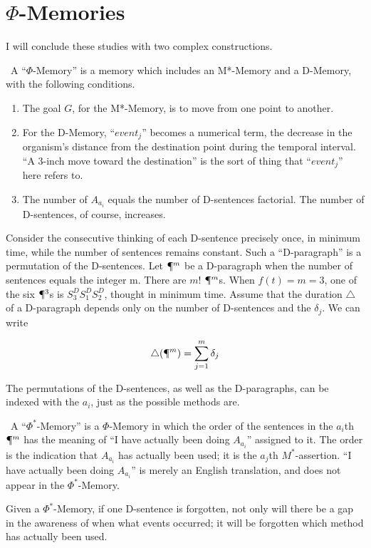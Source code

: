 \section{$\Phi$-Memories}
I will conclude these studies with two complex constructions. 

\begin{hangers}
\ A \enquote{$\Phi$-Memory} is a memory which includes an M*-Memory 
and a D-Memory, with the following conditions. 
\begin{enumerate}
\item The goal $G$, for the M*-Memory, is to move from one point to another. 

\item For the D-Memory, \enquote{$event_j$} becomes a numerical term, the decrease in the organism's distance 
from the destination point during the temporal interval. \enquote{A 3-inch move 
toward the destination} is the sort of thing that \enquote{$event_j$} here refers to. 

\item The number of $A_{a_i}$ equals the number of D-sentences factorial. The number 
of D-sentences, of course, increases. 
\end{enumerate}
\end{hangers}

Consider the consecutive thinking of each D-sentence precisely once, in 
minimum time, while the number of sentences remains constant. Such a 
\enquote{D-paragraph} is a permutation of the D-sentences. Let $\mathparagraph^m$ be a 
D-paragraph when the number of sentences equals the integer m. There are 
$m!$ $\mathparagraph^m$s. When $f(t)=m=3$, one of the six $\mathparagraph^3$s is $S^D_3 S^D_1 S^D_2$, 
thought in 
minimum time. Assume that the duration $\triangle$ of a D-paragraph depends only 
on the number of D-sentences and the $\delta_j$. We can write 

$$ \triangle(\mathparagraph^m)=\sum_{j=1}^{m} \delta_j $$

The permutations of the D-sentences, as well as the D-paragraphs, can be 
indexed with the $a_i$, just as the possible methods are. 

\begin{hangers}
\ A \enquote{$\Phi^*$-Memory} is a $\Phi$-Memory in which the order of the 
sentences in the $a_i$th $\mathparagraph^m$ has the meaning of \enquote{I have actually been doing $A_{a_i}$}
assigned to it. The order is the indication that $A_{a_i}$ has actually been used; it 
is the $a_j$th $M^*$-assertion. \enquote{I have actually been doing $A_{a_i}$} is merely an English 
translation, and does not appear in the $\Phi^*$-Memory. 

 Given a $\Phi^*$-Memory, if one D-sentence is forgotten, not 
only will there be a gap in the awareness of when what events occurred; it 
will be forgotten which method has actually been used. 
\end{hangers}

